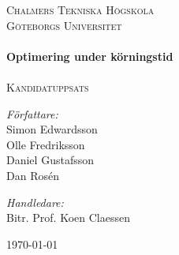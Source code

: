 \documentclass[leqno]{report}
\begin{document}
\begin{comment}
\title{Optimering under körningstid}
\date{\today}
\author{Simon  Edwardsson
   \and Olle   Fredriksson
   \and Daniel Gustafsson
   \and Dan    Rosén
   }
\thanks{Handledare: Koen Claessen}
 
\maketitle
\end{comment}

\begin{titlepage}
 
\begin{center}
 
 
 
\textsc{\LARGE Chalmers Tekniska Högskola \\[0.6cm] Göteborgs Universitet}\\[1.5cm]
 
 
 
\HRule \\[0.4cm]
{ \huge \bfseries Optimering under körningstid}\\[0.3cm]
 
\HRule \\[0.5cm]
 
\textsc{\Large Kandidatuppsats}\\[1.5cm]
\begin{minipage}{0.4\textwidth}
\begin{flushleft} \large
\emph{Författare:}\\
Simon Edwardsson \\
Olle Fredriksson \\
Daniel Gustafsson \\
Dan Rosén
\end{flushleft}
\end{minipage}
\begin{minipage}{0.4\textwidth}
\begin{flushright} \large
\emph{Handledare:} \\
Bitr. Prof. Koen Claessen
\end{flushright}
\end{minipage}
 
\vfill
 
{\large \today}
 
\end{center}
 
\end{titlepage}
\end{document}
